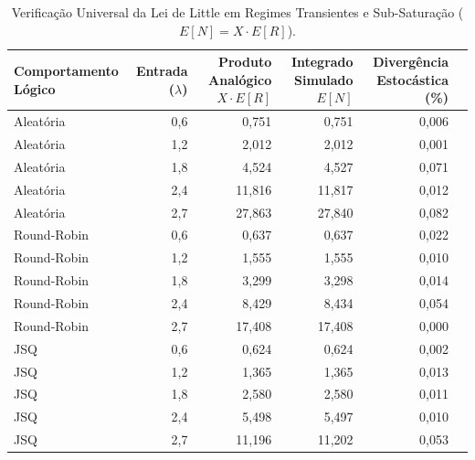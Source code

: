 \documentclass[conference]{IEEEtran}
\begin{document}
\begin{table}[!t]
\centering
\caption{Verificação Universal da Lei de Little em Regimes Transientes e Sub-Saturação ($E[N] = X \cdot E[R]$).}
\label{tab:little}
\small
\setlength{\tabcolsep}{2pt}
\begin{tabular}{@{}lrrrrr@{}}
\toprule
Comportamento Lógico & Entrada ($\lambda$) & Produto Analógico $X \cdot E[R]$ & Integrado Simulado $E[N]$ & Divergência Estocástica (\%) \\
\midrule
Aleatória   & 0,6 & 0,751 & 0,751 & 0,006 \\
Aleatória   & 1,2 & 2,012 & 2,012 & 0,001 \\
Aleatória   & 1,8 & 4,524 & 4,527 & 0,071 \\
Aleatória   & 2,4 & 11,816 & 11,817 & 0,012 \\
Aleatória   & 2,7 & 27,863 & 27,840 & 0,082 \\
Round-Robin & 0,6 & 0,637 & 0,637 & 0,022 \\
Round-Robin & 1,2 & 1,555 & 1,555 & 0,010 \\
Round-Robin & 1,8 & 3,299 & 3,298 & 0,014 \\
Round-Robin & 2,4 & 8,429 & 8,434 & 0,054 \\
Round-Robin & 2,7 & 17,408 & 17,408 & 0,000 \\
JSQ         & 0,6 & 0,624 & 0,624 & 0,002 \\
JSQ         & 1,2 & 1,365 & 1,365 & 0,013 \\
JSQ         & 1,8 & 2,580 & 2,580 & 0,011 \\
JSQ         & 2,4 & 5,498 & 5,497 & 0,010 \\
JSQ         & 2,7 & 11,196 & 11,202 & 0,053 \\
\bottomrule
\end{tabular}
\end{table}
\end{document}
